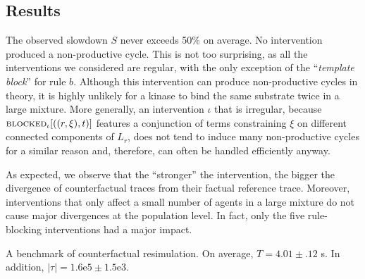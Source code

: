 \subsection{Results}

The observed slowdown $S$ never exceeds 50\% on average. No
intervention produced a non-productive cycle. This is not too
surprising, as all the interventions we considered are regular, with
the only exception of the ``\textit{template block}'' for rule
$b$. Although this intervention can produce non-productive cycles in
theory, it is highly unlikely for a kinase to bind the same substrate
twice in a large mixture. More generally, an intervention $\iota$ that
is irregular, because ${\textsc{blocked}}_{\iota}[((r, \xi), t)]$ features a
conjunction of terms constraining $\xi$ on different connected
components of $L_r$, does not tend to induce many non-productive
cycles for a similar reason and, therefore, can often be handled
efficiently anyway.

As expected, we observe that the ``stronger'' the intervention, the
bigger the divergence of counterfactual traces from their factual
reference trace. Moreover, interventions that only affect a small
number of agents in a large mixture do not cause major divergences at
the population level. In fact, only the five rule-blocking
interventions had a major impact.



 \begin{table}\footnotesize
  \begin{center}
    
  \end{center}
  \caption{
A benchmark of counterfactual resimulation. On average,
    $T = 4.01\pm .12$ s.  In addition,
    $|\tau| = 1.6\mathrm{e}5 \pm 1.5\mathrm{e}3$.}\label{tab:bench}
\end{table}
